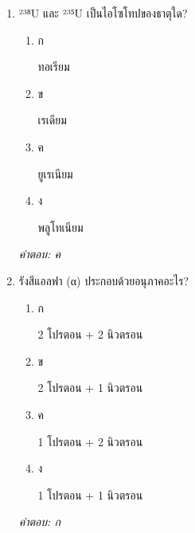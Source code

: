 \documentclass[12pt]{article}
\begin{document}
\begin{enumerate}[label=\arabic*., itemsep=0.5\baselineskip, topsep=0.5\baselineskip, leftmargin=*]
\item ²³⁸U และ ²³⁵U เป็นไอโซโทปของธาตุใด?
\begin{enumerate}[label=\alph*)., itemsep=0.3\baselineskip, topsep=0.3\baselineskip]
\item ก\ 
\begin{minipage}[t]{0.9\linewidth}
\raggedright ทอเรียม
\end{minipage}
\item ข\ 
\begin{minipage}[t]{0.9\linewidth}
\raggedright เรเดียม
\end{minipage}
\item ค\ 
\begin{minipage}[t]{0.9\linewidth}
\raggedright ยูเรเนียม
\end{minipage}
\item ง\ 
\begin{minipage}[t]{0.9\linewidth}
\raggedright พลูโทเนียม
\end{minipage}
\end{enumerate}
\vspace{-0.3\baselineskip}
\begin{small}
\textit{คำตอบ: ค}
\end{small}

\item รังสีแอลฟา (α) ประกอบด้วยอนุภาคอะไร?
\begin{enumerate}[label=\alph*)., itemsep=0.3\baselineskip, topsep=0.3\baselineskip]
\item ก\ 
\begin{minipage}[t]{0.9\linewidth}
\raggedright 2 โปรตอน + 2 นิวตรอน
\end{minipage}
\item ข\ 
\begin{minipage}[t]{0.9\linewidth}
\raggedright 2 โปรตอน + 1 นิวตรอน
\end{minipage}
\item ค\ 
\begin{minipage}[t]{0.9\linewidth}
\raggedright 1 โปรตอน + 2 นิวตรอน
\end{minipage}
\item ง\ 
\begin{minipage}[t]{0.9\linewidth}
\raggedright 1 โปรตอน + 1 นิวตรอน
\end{minipage}
\end{enumerate}
\vspace{-0.3\baselineskip}
\begin{small}
\textit{คำตอบ: ก}
\end{small}


\end{enumerate}
\end{document}
